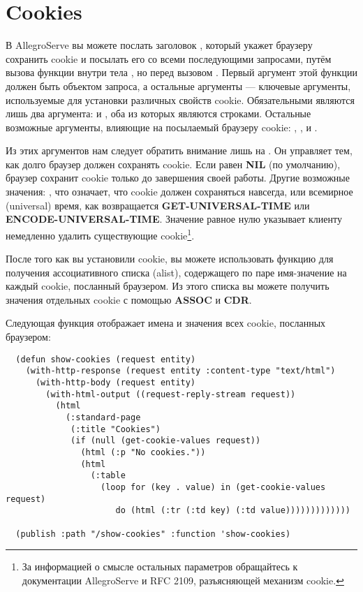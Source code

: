 \section{Cookies}

В AllegroServe вы можете послать заголовок , который укажет браузеру
сохранить cookie и посылать его со всеми последующими запросами, путём вызова функции
 внутри тела , но перед вызовом
. Первый аргумент этой функции должен быть объектом запроса, а
остальные аргументы --- ключевые аргументы, используемые для установки различных свойств
cookie. Обязательными являются лишь два аргумента:  и , оба из
которых являются строками. Остальные возможные аргументы, влияющие на посылаемый браузеру
cookie: , ,  и .

Из этих аргументов нам следует обратить внимание лишь на . Он управляет
тем, как долго браузер должен сохранять cookie. Если  равен \textbf{NIL}
(по умолчанию), браузер сохранит cookie только до завершения своей работы. Другие
возможные значения: , что означает, что cookie должен сохраняться навсегда,
или всемирное (universal) время, как возвращается \textbf{GET-UNIVERSAL-TIME} или
\textbf{ENCODE-UNIVERSAL-TIME}. Значение  равное нулю указывает клиенту
немедленно удалить существующие cookie\footnote{За информацией о смысле остальных
  параметров обращайтесь к документации AllegroServe и RFC 2109, разъясняющей механизм
  cookie.}.

После того как вы установили cookie, вы можете использовать функцию
 для получения ассоциативного списка (alist), содержащего по паре
имя-значение на каждый cookie, посланный браузером. Из этого списка вы можете получить
значения отдельных cookie с помощью \textbf{ASSOC} и \textbf{CDR}.

Следующая функция отображает имена и значения всех cookie, посланных браузером:

\begin{lstlisting}
  (defun show-cookies (request entity)
    (with-http-response (request entity :content-type "text/html")
      (with-http-body (request entity)
        (with-html-output ((request-reply-stream request))
          (html
            (:standard-page
             (:title "Cookies")
             (if (null (get-cookie-values request))
               (html (:p "No cookies."))
               (html 
                 (:table
                   (loop for (key . value) in (get-cookie-values request)
                      do (html (:tr (:td key) (:td value)))))))))))))

  (publish :path "/show-cookies" :function 'show-cookies)
\end{lstlisting}

